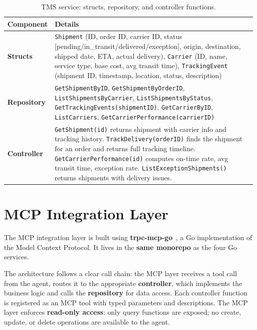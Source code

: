 \documentclass[12pt,a4paper]{report}
\begin{document}
\begin{table}[H]
\centering\small
\caption{TMS service: structs, repository, and controller functions.}
\begin{tabularx}{\textwidth}{@{} l X @{}}
\toprule
\textbf{Component} & \textbf{Details} \\
\midrule
\textbf{Structs} &
    \texttt{Shipment} (ID, order ID, carrier ID, status [pending/in\_transit/delivered/exception], origin, destination, shipped date, ETA, actual delivery),
    \texttt{Carrier} (ID, name, service type, base cost, avg transit time),
    \texttt{TrackingEvent} (shipment ID, timestamp, location, status, description) \\
\textbf{Repository} &
    \texttt{GetShipmentByID}, \texttt{GetShipmentByOrderID}, \texttt{ListShipmentsByCarrier},
    \texttt{ListShipmentsByStatus}, \texttt{GetTrackingEvents(shipmentID)},
    \texttt{GetCarrierByID}, \texttt{ListCarriers},
    \texttt{GetCarrierPerformance(carrierID)} \\
\textbf{Controller} &
    \texttt{GetShipment(id)} returns shipment with carrier info and tracking history.
    \texttt{TrackDelivery(orderID)} finds the shipment for an order and returns full tracking timeline.
    \texttt{GetCarrierPerformance(id)} computes on-time rate, avg transit time, exception rate.
    \texttt{ListExceptionShipments()} returns shipments with delivery issues. \\
\bottomrule
\end{tabularx}
\end{table}

\section{MCP Integration Layer}

The MCP integration layer is built using \textbf{trpc-mcp-go}~\cite{trpcmcpgo}, a Go implementation of the Model Context Protocol. It lives in the \textbf{same monorepo} as the four Go services.

The architecture follows a clear call chain: the MCP layer receives a tool call from the agent, routes it to the appropriate \textbf{controller}, which implements the business logic and calls the \textbf{repository} for data access. Each controller function is registered as an MCP tool with typed parameters and descriptions. The MCP layer enforces \textbf{read-only access}: only query functions are exposed; no create, update, or delete operations are available to the agent.
\end{document}
